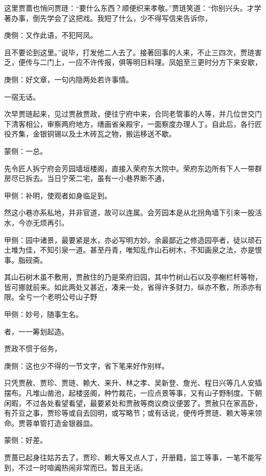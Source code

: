 \begin{parag}
    这里贾蔷也悄问贾琏：“要什么东西？顺便织来孝敬。”贾琏笑道：“你别兴头。才学著办事，倒先学会了这把戏。我短了什么，少不得写信来告诉你，\begin{note}庚侧：又作此语，不犯阿凤。\end{note}且不要论到这里。”说毕，打发他二人去了。接著回事的人来，不止三四次，贾琏害乏，便传与二门上，一应不许传报，俱等明日料理。凤姐至三更时分方下来安歇，\begin{note}庚侧：好文章，一句内隐两处若许事情。\end{note}一宿无话。
\end{parag}


\begin{parag}
    次早贾琏起来，见过贾赦贾政，便往宁府中来，合同老管事的人等，并几位世交门下清客相公，审察两府地方，缮画省亲殿宇，一面察度办理人丁。自此后，各行匠役齐集，金银铜锡以及土木砖瓦之物，搬运移送不歇。\begin{note}蒙侧：一总。\end{note}先令匠人拆宁府会芳园墙垣楼阁，直接入荣府东大院中。荣府东边所有下人一带群房尽已拆去。当日宁荣二宅，虽有一小巷界断不通，\begin{note}甲侧：补明，使观者如身临足到。\end{note}然这小巷亦系私地，并非官道，故可以连属。会芳园本是从北拐角墙下引来一股活水，今亦无烦再引。\begin{note}甲侧：园中诸景，最要紧是水，亦必写明方妙。余最鄙近之修造园亭者，徒以顽石土堆为佳，不知引泉一道。甚至丹青，唯知乱作山石树木，不知画泉之法，亦是恨事。脂砚斋。\end{note}其山石树木虽不敷用，贾赦住的乃是荣府旧园，其中竹树山石以及亭榭栏杆等物，皆可挪就前来。如此两处又甚近，凑来一处，省得许多财力，纵亦不敷，所添亦有限。全亏一个老明公号山子野\begin{note}甲侧：妙号，随事生名。\end{note}者，一一筹划起造。
\end{parag}


\begin{parag}
    贾政不惯于俗务，\begin{note}庚侧：这也少不得的一节文字，省下笔来好作别样。\end{note}只凭贾赦、贾珍、贾琏、赖大、来升、林之孝、吴新登、詹光、程日兴等几人安插摆布。凡堆山凿池，起楼竖阁，种竹裁花，一应点景等事，又有山子野制度。下朝闲暇，不过各处看望看望，最要紧处和贾赦等商议商议便罢了。贾赦只在家高卧，有芥豆之事，贾珍等或自去回明，或写略节；或有话说，便传呼贾琏、赖大等来领命。贾蓉单管打造金银器皿。\begin{note}蒙侧：好差。\end{note}贾蔷已起身往姑苏去了。贾珍、赖大等又点人丁，开册籍，监工等事，一笔不能写到，不过一时喧阗热闹非常而已。暂且无话。
\end{parag}


